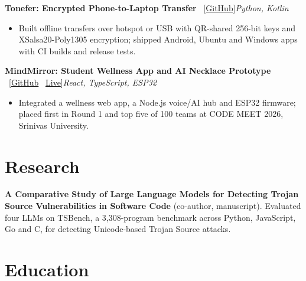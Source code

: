 \documentclass[a4paper,10pt]{article}
\newenvironment{bullets}{\begin{itemize}[leftmargin=1.2em, itemsep=1pt, topsep=1.5pt, partopsep=0pt, parsep=0pt]}{\end{itemize}\vspace{1pt}}
\newcommand{\project}[3]{\textbf{#1} \ {\small [#3]}\hfill{\small\itshape #2}\vspace{1pt}}
\begin{document}
\project{Tonefer: Encrypted Phone-to-Laptop Transfer}{Python, Kotlin}{\href{https://github.com/pankqx/Tonefer}{GitHub}}
\begin{bullets}
  \item Built offline transfers over hotspot or USB with QR-shared 256-bit keys and XSalsa20-Poly1305 encryption; shipped Android, Ubuntu and Windows apps with CI builds and release tests.
\end{bullets}

\project{MindMirror: Student Wellness App and AI Necklace Prototype}{React, TypeScript, ESP32}{\href{https://github.com/pankqx/MindMirror}{GitHub} \textbar\ \href{https://pankqx.github.io/MindMirror/}{Live}}
\begin{bullets}
  \item Integrated a wellness web app, a Node.js voice/AI hub and ESP32 firmware; placed first in Round 1 and top five of 100 teams at CODE MEET 2026, Srinivas University.
\end{bullets}

\section*{Research}
\textbf{A Comparative Study of Large Language Models for Detecting Trojan Source Vulnerabilities in Software Code} (co-author, manuscript). Evaluated four LLMs on TSBench, a 3,308-program benchmark across Python, JavaScript, Go and C, for detecting Unicode-based Trojan Source attacks.

\section*{Education}
\renewcommand{\arraystretch}{1.1}
\end{document}
